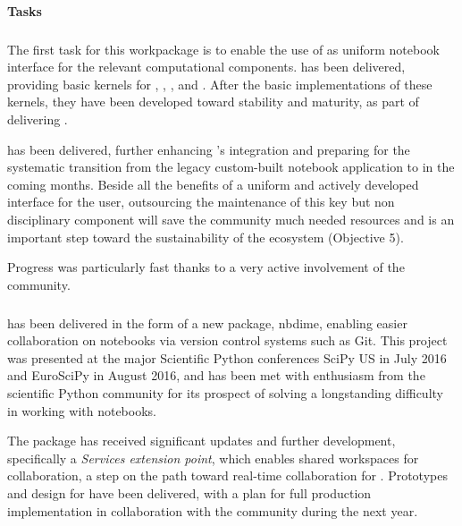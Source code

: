 
\paragraph{Tasks}

\subparagraph{}
\label{UI@ipython-kernels}


The first task for this workpackage is to enable the use of \Jupyter
as uniform notebook interface for the relevant computational
components.  has been delivered,
providing basic \Jupyter kernels for \GAP, \Pari, \Sage, and
\Singular.
After the basic implementations of these kernels,
they have been developed toward stability and maturity,
as part of delivering .

 has been delivered, further
enhancing \Sage's \Jupyter integration and preparing for the
systematic transition from the legacy custom-built \Sage notebook
application to \Jupyter in the coming months. Beside all the benefits
of a uniform and actively developed interface for the user,
outsourcing the maintenance of this key but non disciplinary component
will save the \Sage community much needed resources and is an
important step toward the sustainability of the \ODK ecosystem
(Objective 5).

Progress was particularly fast thanks to a very active involvement of
the \Sage community.

\subparagraph{}

 has been delivered in the form of a new \Jupyter package, nbdime,
enabling easier collaboration on notebooks via version control systems such as Git. This project
was presented at the major Scientific Python conferences SciPy US in July 2016 and EuroSciPy in August 2016,
and has been met with enthusiasm from the scientific Python community for its prospect of solving a
longstanding difficulty in working with notebooks.

The \JupyterHub package has received significant updates and further development, specifically a
\emph{Services extension point}, which enables shared workspaces for collaboration, a step on the path
toward real-time collaboration for .
Prototypes and design for  have been delivered,
with a plan for full production implementation in collaboration with the \Jupyter community during the next year.

